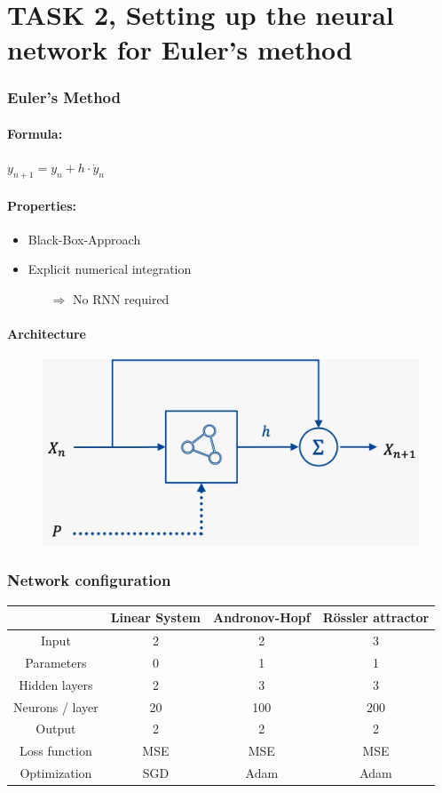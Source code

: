\section{TASK 2, Setting up the neural network for Euler's method}

\begin{frame}
	\frametitle{Euler's Method}
	\paragraph{Formula:}\vspace{-1mm}
	\quad\quad $y_{n+1} = y_n + h \cdot \dot{y}_n$
	\vspace{1mm}
	
	\paragraph{Properties:}\vspace{-2mm}
	\begin{itemize}
		\item Black-Box-Approach
		\item Explicit numerical integration
		\begin{itemize}
			\item[$\Rightarrow$] No RNN required
		\end{itemize}
	\end{itemize}
	
	\paragraph{Architecture}\vspace{2mm}
	\begin{figure}[H]
		\centering
		\includegraphics[width=.5\linewidth]{figures/euler/net_architecture}
	\end{figure}
\end{frame}

\begin{frame}
	\frametitle{Network configuration}
	\centering
	\begin{tabular} { c | c | c | c}
						& Linear System & Andronov-Hopf & R\"ossler attractor	\\
		\hline
		Input			& 2 		& 2			& 3			\\
		\hline
		Parameters		& 0 		& 1			& 1			\\
		\hline
		Hidden layers	& 2			& 3			& 3			\\
		\hline
		Neurons / layer	& 20		& 100		& 200		\\
		\hline
		Output			& 2			& 2			& 2			\\
		\hline
		Loss function	& MSE		& MSE		& MSE		\\
		\hline
		Optimization	& SGD		& Adam		& Adam		\\
	\end{tabular}
\end{frame}
